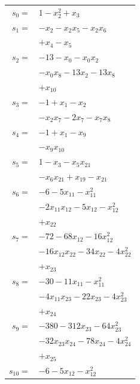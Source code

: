 \begingroup
\small
\setlength{\tabcolsep}{2pt}
\setlength{\LTleft}{0pt}
\begin{longtable}{@{}r@{\;}l@{}}
\(s_{0}=\) & \(\displaystyle 1 -x_{2}^{2} +x_{3}\) \\[3pt]
\(s_{1}=\) & \(\displaystyle -x_{2} -x_{2}x_{5} -x_{2}x_{6}\) \\
 & \(\displaystyle +x_{4} -x_{5}\) \\[3pt]
\(s_{2}=\) & \(\displaystyle -13 -x_{0} -x_{0}x_{2}\) \\
 & \(\displaystyle -x_{0}x_{8} -13x_{2} -13x_{8}\) \\
 & \(\displaystyle +x_{10}\) \\[3pt]
\(s_{3}=\) & \(\displaystyle -1 +x_{1} -x_{2}\) \\
 & \(\displaystyle -x_{2}x_{7} -2x_{7} -x_{7}x_{8}\) \\[3pt]
\(s_{4}=\) & \(\displaystyle -1 +x_{1} -x_{9}\) \\
 & \(\displaystyle -x_{9}x_{10}\) \\[3pt]
\(s_{5}=\) & \(\displaystyle 1 -x_{3} -x_{5}x_{21}\) \\
 & \(\displaystyle -x_{6}x_{21} +x_{19} -x_{21}\) \\[3pt]
\(s_{6}=\) & \(\displaystyle -6 -5x_{11} -x_{11}^{2}\) \\
 & \(\displaystyle -2x_{11}x_{12} -5x_{12} -x_{12}^{2}\) \\
 & \(\displaystyle +x_{22}\) \\[3pt]
\(s_{7}=\) & \(\displaystyle -72 -68x_{12} -16x_{12}^{2}\) \\
 & \(\displaystyle -16x_{12}x_{22} -34x_{22} -4x_{22}^{2}\) \\
 & \(\displaystyle +x_{23}\) \\[3pt]
\(s_{8}=\) & \(\displaystyle -30 -11x_{11} -x_{11}^{2}\) \\
 & \(\displaystyle -4x_{11}x_{23} -22x_{23} -4x_{23}^{2}\) \\
 & \(\displaystyle +x_{24}\) \\[3pt]
\(s_{9}=\) & \(\displaystyle -380 -312x_{23} -64x_{23}^{2}\) \\
 & \(\displaystyle -32x_{23}x_{24} -78x_{24} -4x_{24}^{2}\) \\
 & \(\displaystyle +x_{25}\) \\[3pt]
\(s_{10}=\) & \(\displaystyle -6 -5x_{12} -x_{12}^{2}\) \\

\end{longtable}

